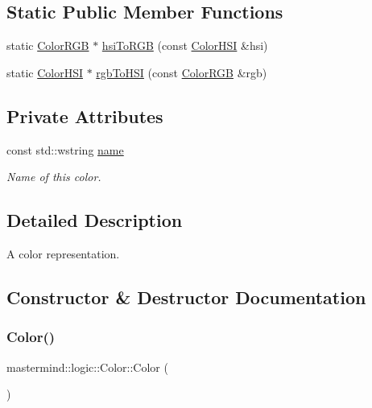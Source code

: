 \subsection*{Static Public Member Functions}
\begin{DoxyCompactItemize}
\item 
static \hyperlink{classmastermind_1_1logic_1_1_color_r_g_b}{Color\+R\+GB} $\ast$ \hyperlink{classmastermind_1_1logic_1_1_color_abdfea9c0cb5c82afd84c96422a520655}{hsi\+To\+R\+GB} (const \hyperlink{classmastermind_1_1logic_1_1_color_h_s_i}{Color\+H\+SI} \&hsi)
\item 
static \hyperlink{classmastermind_1_1logic_1_1_color_h_s_i}{Color\+H\+SI} $\ast$ \hyperlink{classmastermind_1_1logic_1_1_color_a8a5e0010371827813a79b778af116bdb}{rgb\+To\+H\+SI} (const \hyperlink{classmastermind_1_1logic_1_1_color_r_g_b}{Color\+R\+GB} \&rgb)
\end{DoxyCompactItemize}
\subsection*{Private Attributes}
\begin{DoxyCompactItemize}
\item 
const std\+::wstring \hyperlink{classmastermind_1_1logic_1_1_color_aa086b665d9a43db3acbd43ed7f4d31ba}{name}
\begin{DoxyCompactList}\small\item\em Name of this color. \end{DoxyCompactList}\end{DoxyCompactItemize}


\subsection{Detailed Description}
A color representation. 

\subsection{Constructor \& Destructor Documentation}
\hypertarget{classmastermind_1_1logic_1_1_color_a9f3666f78ecc894138a724d57ec271b2}{}\label{classmastermind_1_1logic_1_1_color_a9f3666f78ecc894138a724d57ec271b2} 
\subsubsection{\texorpdfstring{Color()}{Color()}\hspace{0.1cm}{\footnotesize\ttfamily [1/2]}}
{\footnotesize\ttfamily mastermind\+::logic\+::\+Color\+::\+Color (\begin{DoxyParamCaption}{ }\end{DoxyParamCaption})}

